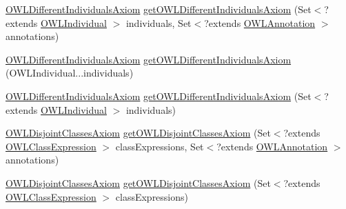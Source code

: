 \begin{DoxyCompactItemize}
\item 
\hyperlink{interfaceorg_1_1semanticweb_1_1owlapi_1_1model_1_1_o_w_l_different_individuals_axiom}{O\-W\-L\-Different\-Individuals\-Axiom} \hyperlink{classuk_1_1ac_1_1manchester_1_1cs_1_1owl_1_1owlapi_1_1_o_w_l_data_factory_impl_ab7fa3c79ec8f9b50f59120d334b09619}{get\-O\-W\-L\-Different\-Individuals\-Axiom} (Set$<$?extends \hyperlink{interfaceorg_1_1semanticweb_1_1owlapi_1_1model_1_1_o_w_l_individual}{O\-W\-L\-Individual} $>$ individuals, Set$<$?extends \hyperlink{interfaceorg_1_1semanticweb_1_1owlapi_1_1model_1_1_o_w_l_annotation}{O\-W\-L\-Annotation} $>$ annotations)
\item 
\hyperlink{interfaceorg_1_1semanticweb_1_1owlapi_1_1model_1_1_o_w_l_different_individuals_axiom}{O\-W\-L\-Different\-Individuals\-Axiom} \hyperlink{classuk_1_1ac_1_1manchester_1_1cs_1_1owl_1_1owlapi_1_1_o_w_l_data_factory_impl_a8813a6e2a728f3a2738a536a5b92432d}{get\-O\-W\-L\-Different\-Individuals\-Axiom} (O\-W\-L\-Individual...\-individuals)
\item 
\hyperlink{interfaceorg_1_1semanticweb_1_1owlapi_1_1model_1_1_o_w_l_different_individuals_axiom}{O\-W\-L\-Different\-Individuals\-Axiom} \hyperlink{classuk_1_1ac_1_1manchester_1_1cs_1_1owl_1_1owlapi_1_1_o_w_l_data_factory_impl_ad0dfeab9f84a92208943c3c423f88f3d}{get\-O\-W\-L\-Different\-Individuals\-Axiom} (Set$<$?extends \hyperlink{interfaceorg_1_1semanticweb_1_1owlapi_1_1model_1_1_o_w_l_individual}{O\-W\-L\-Individual} $>$ individuals)
\item 
\hyperlink{interfaceorg_1_1semanticweb_1_1owlapi_1_1model_1_1_o_w_l_disjoint_classes_axiom}{O\-W\-L\-Disjoint\-Classes\-Axiom} \hyperlink{classuk_1_1ac_1_1manchester_1_1cs_1_1owl_1_1owlapi_1_1_o_w_l_data_factory_impl_ab61ce4bdb2537a66bd0058df12a34de1}{get\-O\-W\-L\-Disjoint\-Classes\-Axiom} (Set$<$?extends \hyperlink{interfaceorg_1_1semanticweb_1_1owlapi_1_1model_1_1_o_w_l_class_expression}{O\-W\-L\-Class\-Expression} $>$ class\-Expressions, Set$<$?extends \hyperlink{interfaceorg_1_1semanticweb_1_1owlapi_1_1model_1_1_o_w_l_annotation}{O\-W\-L\-Annotation} $>$ annotations)
\item 
\hyperlink{interfaceorg_1_1semanticweb_1_1owlapi_1_1model_1_1_o_w_l_disjoint_classes_axiom}{O\-W\-L\-Disjoint\-Classes\-Axiom} \hyperlink{classuk_1_1ac_1_1manchester_1_1cs_1_1owl_1_1owlapi_1_1_o_w_l_data_factory_impl_ade005f0d7560ca55b60f15d0a8e3f2d3}{get\-O\-W\-L\-Disjoint\-Classes\-Axiom} (Set$<$?extends \hyperlink{interfaceorg_1_1semanticweb_1_1owlapi_1_1model_1_1_o_w_l_class_expression}{O\-W\-L\-Class\-Expression} $>$ class\-Expressions)

\end{DoxyCompactItemize}
